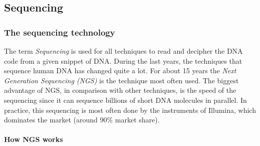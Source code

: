 \subsection{Sequencing}

\subsubsection{The sequencing technology}

The term \emph{Sequencing} is used for all techniques to read and decipher the DNA code from a given snippet of DNA. During the last years, the techniques that sequence human DNA has changed quite a lot. For about 15 years the \emph{Next Generation Sequencing (NGS)} is the technique most often used. The biggest advantage of NGS, in comparison with other techniques, is the speed of the sequencing since it can sequence billions of short DNA molecules in parallel. In practice, this sequencing is most often done by the instruments of Illumina, which dominates the market (around 90\% market share).

\paragraph{How NGS works}

